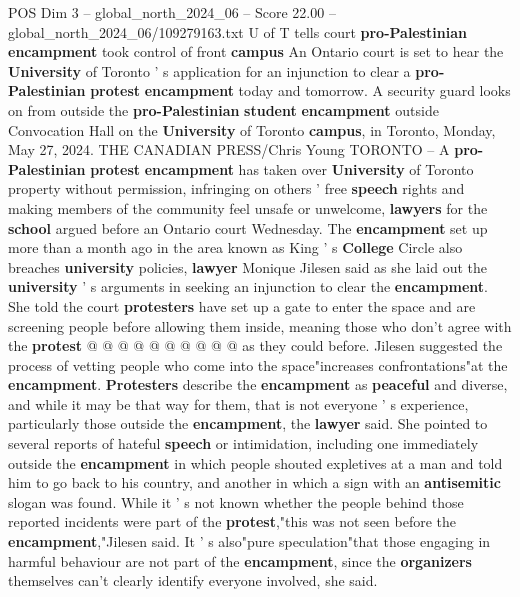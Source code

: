\begin{textsample}{POS Dim 3 – global\_north\_2024\_06 – Score 22.00 – global\_north\_2024\_06/109279163.txt}  \label{ex:f3_pos_068}
U of T tells court \textbf{pro-Palestinian} \textbf{encampment} took control of front \textbf{campus} An Ontario court is set to hear the \textbf{University} of Toronto ' s application for an injunction to clear a \textbf{pro-Palestinian} \textbf{protest} \textbf{encampment} today and tomorrow.
A security guard looks on from outside the \textbf{pro-Palestinian} \textbf{student} \textbf{encampment} outside Convocation Hall on the \textbf{University} of Toronto \textbf{campus}, in Toronto, Monday, May 27, 2024.
THE CANADIAN PRESS/Chris Young TORONTO -- A \textbf{pro-Palestinian} \textbf{protest} \textbf{encampment} has taken over \textbf{University} of Toronto property without permission, infringing on others ' free \textbf{speech} rights and making members of the community feel unsafe or unwelcome, \textbf{lawyers} for the \textbf{school} argued before an Ontario court Wednesday.
The \textbf{encampment} set up more than a month ago in the area known as King ' s \textbf{College} Circle also breaches \textbf{university} policies, \textbf{lawyer} Monique Jilesen said as she laid out the \textbf{university} ' s arguments in seeking an injunction to clear the \textbf{encampment}.
She told the court \textbf{protesters} have set up a gate to enter the space and are screening people before allowing them inside, meaning those who don't agree with the \textbf{protest} @ @ @ @ @ @ @ @ @ @ as they could before.
Jilesen suggested the process of vetting people who come into the space"increases confrontations"at the \textbf{encampment}. \textbf{Protesters} describe the \textbf{encampment} as \textbf{peaceful} and diverse, and while it may be that way for them, that is not everyone ' s experience, particularly those outside the \textbf{encampment}, the \textbf{lawyer} said.
She pointed to several reports of hateful \textbf{speech} or intimidation, including one immediately outside the \textbf{encampment} in which people shouted expletives at a man and told him to go back to his country, and another in which a sign with an \textbf{antisemitic} slogan was found.
While it ' s not known whether the people behind those reported incidents were part of the \textbf{protest},"this was not seen before the \textbf{encampment},"Jilesen said.
It ' s also"pure speculation"that those engaging in harmful behaviour are not part of the \textbf{encampment}, since the \textbf{organizers} themselves can't clearly identify everyone involved, she said.

\end{textsample}
